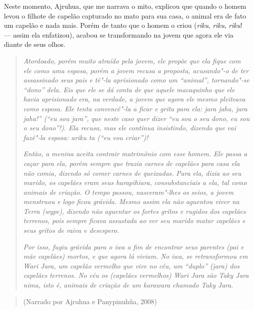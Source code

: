 Neste momento, Ajruhua, que me narrava o mito, explicou que quando o
homem levou o filhote de capelão capturado no mato para sua casa, o
animal era de fato um capelão e nada mais. Porém de tanto que o homem o
criou (\emph{riku}, \emph{riku}, \emph{riku}! --- assim ela enfatizou),
acabou se transformando na jovem que agora ele via diante de seus olhos.

\begin{quote}
\forceindent
\emph{Atordoado, porém muito atraído pela jovem, ele propõe que ela fique com
ele como uma esposa, porém a jovem recusa a proposta, acusando"-o de ter
assassinado seus pais e tê"-la aprisionado como um ``animal'',
tornando"-se ``dono'' dela. Eis que ele se dá conta de que aquele
macaquinho que ele havia aprisionado era, na verdade, a jovem que agora
ele mesmo pleiteava como esposa. Ele tenta convencê"-la a ficar e grita
para ela: \emph{jara jaha}, \emph{jara jaha}!'' (``eu sou \emph{jara''},
que neste caso quer dizer ``eu sou o seu dono, eu sou o seu dono''!). Ela
recusa, mas ele continua insistindo, dizendo que vai fazê"-la esposa:
\emph{ariku} \emph{ta} (``eu vou criar'')!}

\emph{Então, a menina aceita contrair matrimônio com esse homem. Ele passa a
caçar para ela, porém sempre que trazia carnes de capelães para casa ela
não comia, dizendo só comer carnes de queixadas. Para ela, dizia ao seu
marido, os capelães eram seus \emph{harapihiara}, consubstanciais a ela,
tal como animais de criação. O tempo passou, nasceram"-lhes os seios, a
jovem menstruou e logo ficou grávida. Mesmo assim ela não aguentou viver
na Terra (\emph{wype}), dizendo não aguentar os fortes gritos e rugidos
dos capelães terrenos, pois sempre ficava assustada ao ver seu marido
matar capelães e seus gritos de raiva e desespero}.

\emph{Por isso, fugiu grávida para o \emph{iwa} a fim de encontrar seus
parentes (pai e mãe capelães) mortos, e que agora lá viviam. No
\emph{iwa}, se retransformou em \emph{Wari} \emph{Jara}, um capelão
vermelho que vive no céu, um ``duplo'' (\emph{jara}) dos capelães
terrenos. No céu os (capelães vermelhos) \emph{Wari} \emph{Jara} são
\emph{Taky} \emph{Jara} \emph{nima}, isto é, animais de criação de um
\emph{karawara} chamado \emph{Taky} \emph{Jara}}.
\end{quote}

\begin{quote}
\begin{flushright}
(Narrado por Ajruhua e Panypinuhũa, 2008)
\end{flushright}
\end{quote}

